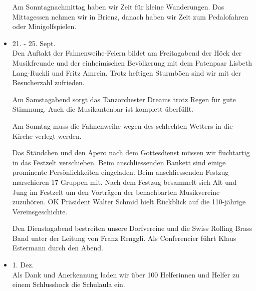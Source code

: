 \begin{history}
\begin{itemize}
        Am Sonntagnachmittag haben wir Zeit für kleine Wanderungen. Das
        Mittagessen nehmen wir in Brienz, danach haben wir Zeit zum Pedalofahren
        oder Minigolfspielen.

        \item[]21. - 25. Sept.\\
        Den Auftakt der Fahnenweihe-Feiern bildet am Freitagabend der Höck der
        Musikfreunde und der einheimischen Bevölkerung mit dem Patenpaar Lisbeth
        Lang-Ruckli und Fritz Amrein. Trotz heftigen Sturmböen sind wir mit der
        Besucherzahl zufrieden.

        Am Samstagabend sorgt das Tanzorchester Dreams trotz Regen für gute
        Stimmung. Auch die Musikantenbar ist komplett überfüllt.

        Am Sonntag muss die Fahnenweihe wegen des schlechten Wetters in die
        Kirche verlegt werden.


        Das Ständchen und den Apero nach dem Gottesdienst
        müssen wir fluchtartig in das Festzelt verschieben. Beim anschliessenden
        Bankett sind einige prominente Persönlichkeiten eingeladen. Beim
        anschliessenden Festzug marschieren 17 Gruppen mit. Nach dem Festzug
        besammelt sich Alt und Jung im Festzelt um den Vorträgen der
        benachbarten Musikvereine zuzuhören. OK Präsident Walter Schmid hielt
        Rückblick auf die 110-jährige Vereinsgeschichte.

        Den Dienstagabend bestreiten unsere Dorfvereine und die Swiss Rolling
        Brass Band unter der Leitung von Franz Renggli. Als Conferencier führt
        Klaus Estermann durch den Abend.

        \item[]1. Dez.\\
        Als Dank und Anerkennung laden wir über 100 Helferinnen und Helfer zu
        einem Schlusshock die Schulaula ein.

    \end{itemize}

\end{history}

